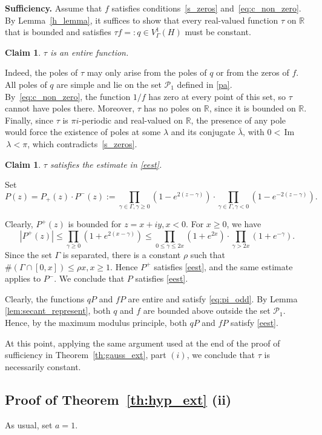 \documentclass[12pt]{amsart}
\numberwithin{equation}{section}
\theoremstyle{plain}
\newtheorem{claim}[theorem]{Claim}
\theoremstyle{definition}
\newcommand{\R}{{\mathbb R}} \newcommand{\Q}{{\mathbb Q}} \newcommand{\Z}{{\mathbb Z}} \newcommand{\N}{{\mathbb N}}
\begin{document}
{\bf Sufficiency.} Assume that $f$ satisfies conditions~\eqref{s_zeros} and~\eqref{eq:c_non_zero}.
By Lemma~\ref{h_lemma}, it suffices to show that every real-valued function $\tau$  on $\R$  that is bounded and satisfies $\tau f=:q\in V^1_{\Gamma}(H)$ must be constant.



\begin{claim}
    $\tau$ is an entire function.
\end{claim}
Indeed, the poles of $\tau$ may only arise from the poles of $q$ or from the zeros of $f$. All poles of $q$ are simple and lie on the set $\mathcal{P}_1$ defined in \eqref{pa}. By~\eqref{eq:c_non_zero}, the function $1/f$ has zero at every point of this set,  so $\tau$ cannot have poles there. Moreover, $\tau$ has no poles on  $\R$, since it is bounded on $\R$. Finally, since $\tau$ is $\pi i$-periodic and real-valued on $\R$, the presence of any pole would force the existence of poles at some $\lambda$ and its conjugate $\bar\lambda$, with $0<\,$Im$\,\lambda<\pi$, which contradicts~\eqref{s_zeros}.

\begin{claim}
    $\tau$ satisfies the estimate in \eqref{eest}.
\end{claim}
Set $$P(z)=P_+(z)\cdot P^-(z):=\prod_{\gamma\in\Gamma,\gamma\geq0}\left(1-e^{2(z-\gamma)}\right)\cdot \prod_{\gamma\in\Gamma,\gamma<0}\left(1-e^{-2(z-\gamma)}\right).$$

Clearly, $P^+(z)$ is bounded for $z=x+iy, x<0.$ For $x\geq0$, we have 
$$|P^+(z)|\leq \prod_{\gamma\geq0}\left(1+e^{2(x-\gamma)}\right)\leq\prod_{0\leq \gamma\leq 2x}\left(1+e^{2x}\right)\cdot\prod_{\gamma> 2x}\left(1+e^{-\gamma}\right). $$
Since the set $\Gamma$ is separated, there is a constant $\rho$ such that $\#(\Gamma\cap [0,x])\leq \rho x, x\geq 1.$
Hence $P^+$ satisfies \eqref{eest}, and the same estimate applies to $P^-$. We conclude that $P$ satisfies \eqref{eest}.

Clearly, the functions $qP$ and $fP$ are entire and satisfy \eqref{eq:pi_odd}.
By Lemma \ref{lem:secant_represent}, both $q$ and $f$ are bounded  above outside the set $\mathcal{P}_1$. 
Hence, by the maximum modulus principle, both  $qP$ and $fP$ satisfy \eqref{eest}. 

At this point, applying the same argument used at the end of the proof of sufficiency in Theorem~\ref{th:gauss_ext}, part $(i)$, we conclude that $\tau$ is necessarily constant.


\subsection{Proof of Theorem~\ref{th:hyp_ext} (ii)}  
As usual, set $a=1.$
\end{document}
